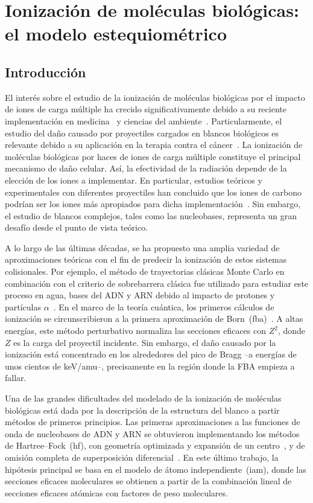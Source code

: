 \chapter{Ionización de moléculas biológicas: el modelo estequiométrico}
\label{chap:ionmol}

\section{Introducción}

El interés sobre el estudio de la ionización de moléculas biológicas por 
el impacto de iones de carga múltiple ha crecido significativamente 
debido a su reciente implementación en medicina~\cite{Baskar:12,Solov:09} 
y ciencias del ambiente~\cite{Gafur:18,FerrazDias:13}. Particularmente, 
el estudio del daño causado por proyectiles cargados en blancos 
biológicos es relevante debido a su aplicación en la terapia contra el 
cáncer~\cite{Baskar:12}. La ionización de moléculas biológicas por haces 
de iones de carga múltiple constituye el principal mecanismo de daño 
celular. Así, la efectividad de la radiación depende de la elección de 
los iones a implementar. En particular, estudios teóricos y 
experimentales con diferentes proyectiles han concluido que los iones de 
carbono podrían ser los iones más apropiados para dicha 
implementación~\cite{Mohamad:17}. Sin embargo, el estudio de blancos 
complejos, tales como las nucleobases, representa un gran desafío desde 
el punto de vista teórico. 

A lo largo de las últimas décadas, se ha propuesto una amplia variedad 
de aproximaciones teóricas con el fin de predecir la ionización de estos 
sistemas colisionales. Por ejemplo, el método de trayectorias clásicas 
Monte Carlo en combinación con el criterio de sobrebarrera clásica fue 
utilizado para estudiar este proceso en agua, bases del ADN y ARN 
debido al impacto de protones y partículas 
$\alpha$~\cite{Abbas:08,Lekadir:09}. En el marco de la teoría cuántica, 
los primeros cálculos de ionización se circunscribieron a la primera 
aproximación de Born~(\acs{fba})~\cite{DalCappello:08,Champion:10}. A 
altas energías, este método perturbativo normaliza las secciones 
eficaces con $Z^2$, donde $Z$ es la carga del proyectil incidente. Sin 
embargo, el daño causado por la ionización está concentrado en los 
alrededores del pico de Bragg --a energías de unos cientos de keV/amu--, 
precisamente en la región donde la FBA empieza a fallar. 

Una de las grandes dificultades del modelado de la ionización de 
moléculas biológicas está dada por la descripción de la estructura del 
blanco a partir métodos de primeros principios. Las primeras 
aproximaciones a las funciones de onda de nucleobases de ADN y ARN se 
obtuvieron implementando los métodos de Hartree--Fock~(\acs{hf}), con 
geometría optimizada y expansión de un centro~\cite{DalCappello:08}, y 
de omisión completa de superposición diferencial~\cite{Champion:10}. En 
este último trabajo, la hipótesis principal se basa en el modelo de 
átomo independiente~(\acs{iam}), donde las secciones eficaces 
moleculares se obtienen a partir de la combinación lineal de secciones 
eficaces atómicas con factores de peso moleculares. 

